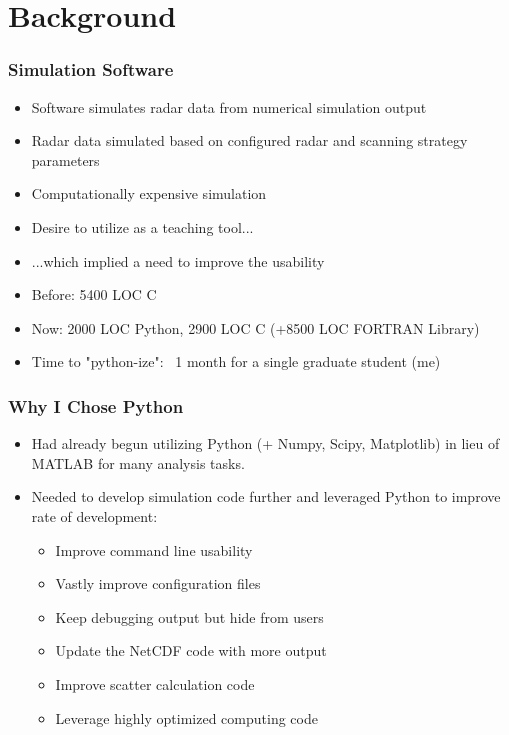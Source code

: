 \documentclass[red, hyperref={pdfpagelabels=false}]{beamer}
\begin{document}
\section{Background}
\begin{frame}[<+->]
  \frametitle{Simulation Software}
  \begin{itemize}
    \item Software simulates radar data from numerical simulation output
    \item Radar data simulated based on configured radar and scanning strategy parameters
    \item Computationally expensive simulation
    \item Desire to utilize as a teaching tool...
    \item ...which implied a need to improve the usability
    \item Before: 5400 LOC C
    \item Now: 2000 LOC Python, 2900 LOC C (+8500 LOC FORTRAN Library)
    \item Time to "python-ize": ~1 month for a single graduate student (me)
  \end{itemize}
\end{frame}

\begin{frame}[<+->]
  \frametitle{Why I Chose Python}
  \begin{itemize}
    \item Had already begun utilizing Python (+ Numpy, Scipy, Matplotlib) in lieu of MATLAB
        for many analysis tasks.
    \item Needed to develop simulation code further and leveraged Python to improve rate of development:
    \begin{itemize}
      \item<3-> Improve command line usability 
      \item<3-> Vastly improve configuration files 
      \item<3-> Keep debugging output but hide from users 
      \item<3-> Update the NetCDF code with more output 
      \item<3-> Improve scatter calculation code 
      \item<3-> Leverage highly optimized computing code 
    \end{itemize}
  \end{itemize}
\end{frame}
\end{document}
